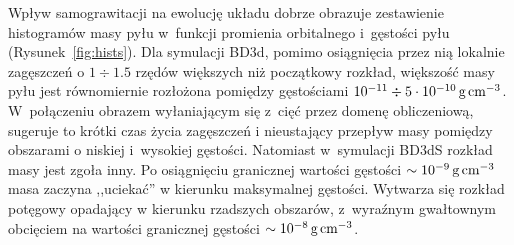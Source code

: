 %
\par Wpływ samograwitacji na ewolucję układu dobrze obrazuje zestawienie
histogramów masy pyłu w~funkcji promienia orbitalnego i~gęstości pyłu
(Rysunek~\ref{fig:hists}). Dla symulacji BD3d, pomimo osiągnięcia przez nią
lokalnie zagęszczeń o $1\div1.5$ rzędów większych niż początkowy rozkład,
większość masy pyłu jest równomiernie rozłożona pomiędzy gęstościami $10^{-11}
\div 5\cdot10^{-10}\hbox{$\thinspace\textrm{g}$}\hbox{$\thinspace\textrm{cm}$}^{-3}$. W~połączeniu obrazem wyłaniającym się z~cięć
przez domenę obliczeniową, sugeruje to krótki czas życia zagęszczeń i
nieustający przepływ masy pomiędzy obszarami o niskiej i~wysokiej gęstości.
Natomiast w~symulacji BD3dS rozkład masy jest zgoła inny. Po osiągnięciu
granicznej wartości gęstości $\sim10^{-9}\hbox{$\thinspace\textrm{g}$}\hbox{$\thinspace\textrm{cm}$}^{-3}$ masa zaczyna ,,uciekać'' w
kierunku maksymalnej gęstości. Wytwarza się rozkład potęgowy opadający w
kierunku rzadszych obszarów, z~wyraźnym gwałtownym obcięciem na wartości
granicznej gęstości $\sim10^{-8}\hbox{$\thinspace\textrm{g}$}\hbox{$\thinspace\textrm{cm}$}^{-3}$.
%
